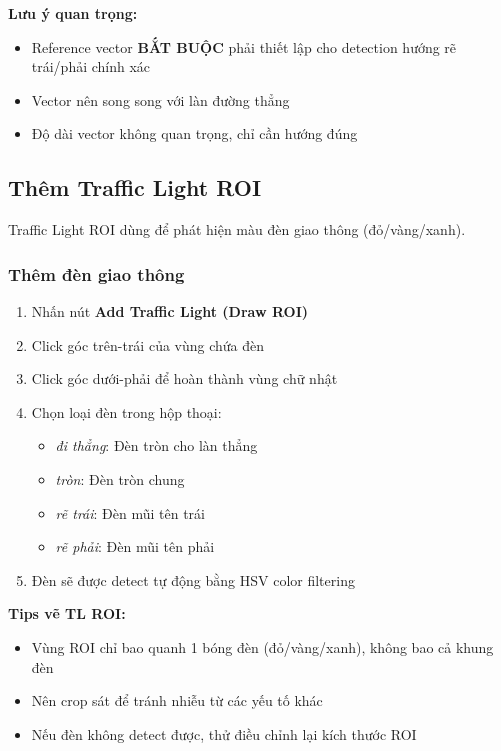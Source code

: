\textbf{Lưu ý quan trọng:}
\begin{itemize}
    \item Reference vector \textbf{BẮT BUỘC} phải thiết lập cho detection hướng rẽ trái/phải chính xác
    \item Vector nên song song với làn đường thẳng
    \item Độ dài vector không quan trọng, chỉ cần hướng đúng
\end{itemize}

\subsection{Thêm Traffic Light ROI}

Traffic Light ROI dùng để phát hiện màu đèn giao thông (đỏ/vàng/xanh).

\subsubsection{Thêm đèn giao thông}
\begin{enumerate}
    \item Nhấn nút \textbf{Add Traffic Light (Draw ROI)}
    \item Click góc trên-trái của vùng chứa đèn
    \item Click góc dưới-phải để hoàn thành vùng chữ nhật
    \item Chọn loại đèn trong hộp thoại:
    \begin{itemize}
        \item \textit{đi thẳng}: Đèn tròn cho làn thẳng
        \item \textit{tròn}: Đèn tròn chung
        \item \textit{rẽ trái}: Đèn mũi tên trái
        \item \textit{rẽ phải}: Đèn mũi tên phải
    \end{itemize}
    \item Đèn sẽ được detect tự động bằng HSV color filtering
\end{enumerate}

\textbf{Tips vẽ TL ROI:}
\begin{itemize}
    \item Vùng ROI chỉ bao quanh 1 bóng đèn (đỏ/vàng/xanh), không bao cả khung đèn
    \item Nên crop sát để tránh nhiễu từ các yếu tố khác
    \item Nếu đèn không detect được, thử điều chỉnh lại kích thước ROI
\end{itemize}

